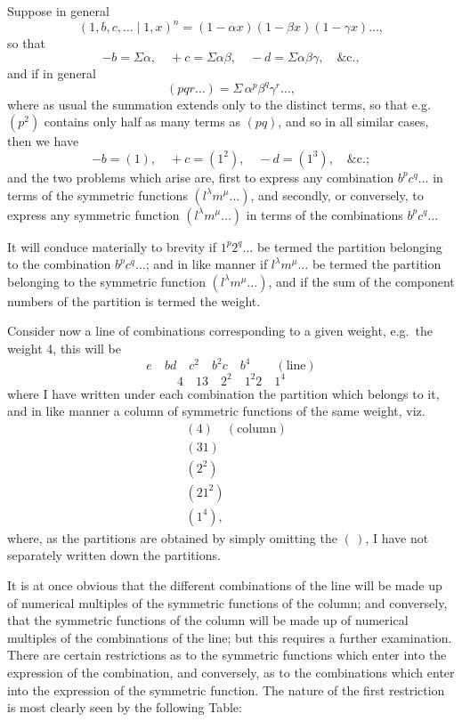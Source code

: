 \documentclass[11pt]{article}
\begin{document}
\medskip

Suppose in general
\[
(1, b, c, \ldots \mid 1, x)^n = (1 - \alpha x)(1 - \beta x)(1 - \gamma x)\ldots,
\]
so that
\[
-b = \Sigma\alpha,\quad +c = \Sigma\alpha\beta,\quad -d = \Sigma\alpha\beta\gamma,\quad \&\text{c.},
\]
and if in general
\[
(pqr\ldots) = \Sigma\,\alpha^p \beta^q \gamma^r \ldots,
\]
where as usual the summation extends only to the distinct terms, so that e.g.\ $(p^2)$ contains only half as many terms as $(pq)$, and so in all similar cases, then we have
\[
-b = (1),\quad +c = (1^2),\quad -d = (1^3),\quad \&\text{c.};
\]
and the two problems which arise are, first to express any combination $b^p c^q \ldots$ in terms of the symmetric functions $(l^\lambda m^\mu \ldots)$, and secondly, or conversely, to express any symmetric function $(l^\lambda m^\mu \ldots)$ in terms of the combinations $b^p c^q\ldots$

\medskip

It will conduce materially to brevity if $1^p 2^q \ldots$ be termed the partition belonging to the combination $b^p c^q\ldots$; and in like manner if $l^\lambda m^\mu\ldots$ be termed the partition belonging to the symmetric function $(l^\lambda m^\mu\ldots)$, and if the sum of the component numbers of the partition is termed the weight.

\medskip

Consider now a line of combinations corresponding to a given weight, e.g.\ the weight 4, this will be
\[
e\quad bd\quad c^2\quad b^2 c\quad b^4 \qquad (\text{line})
\]
\[
4\quad 13\quad 2^2\quad 1^2 2\quad 1^4
\]
where I have written under each combination the partition which belongs to it, and in like manner a column of symmetric functions of the same weight, viz.
\begin{align*}
&(4) \quad (\text{column})\\
&(31)\\
&(2^2)\\
&(21^2)\\
&(1^4),
\end{align*}
where, as the partitions are obtained by simply omitting the $(\,)$, I have not separately written down the partitions.

\medskip

It is at once obvious that the different combinations of the line will be made up of numerical multiples of the symmetric functions of the column; and conversely, that the symmetric functions of the column will be made up of numerical multiples of the combinations of the line; but this requires a further examination. There are certain restrictions as to the symmetric functions which enter into the expression of the combination, and conversely, as to the combinations which enter into the expression of the symmetric function. The nature of the first restriction is most clearly seen by the following Table:
\end{document}
